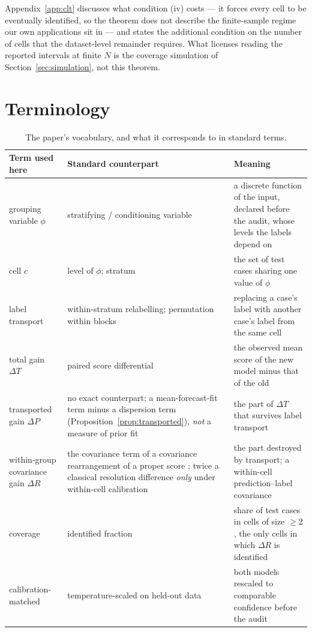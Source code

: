 Appendix~\ref{app:clt} discusses what condition (iv) costs --- it forces every cell to be
eventually identified, so the theorem does not describe the finite-sample regime our own
applications sit in --- and states the additional condition on the number of cells that the
dataset-level remainder requires. What licenses reading the reported intervals at finite $N$
is the coverage simulation of Section~\ref{sec:simulation}, not this theorem.

\section{Terminology}\label{app:terms}

\begin{table}[t]
\centering
\small
\caption{The paper's vocabulary, and what it corresponds to in standard terms.}
\label{tab:terms}
\begin{tabular}{@{}p{}p{}p{}@{}}
\toprule
Term used here & Standard counterpart & Meaning \\
\midrule
grouping variable $\phi$ &
stratifying / conditioning variable &
a discrete function of the input, declared before the audit, whose levels the labels
depend on \\
cell $c$ &
level of $\phi$; stratum &
the set of test cases sharing one value of $\phi$ \\
label transport &
within-stratum relabelling; permutation within blocks &
replacing a case's label with another case's label from the same cell \\
total gain $\Delta T$ &
paired score differential &
the observed mean score of the new model minus that of the old \\
transported gain $\Delta P$ &
no exact counterpart; a mean-forecast-fit term minus a dispersion term
(Proposition~\ref{prop:transported}), \emph{not} a measure of prior fit &
the part of $\Delta T$ that survives label transport \\
within-group covariance gain $\Delta R$ &
the covariance term of a covariance rearrangement of a proper score
\citep{yates1982external}; twice a classical resolution difference \emph{only} under
within-cell calibration &
the part destroyed by transport; a within-cell prediction--label covariance \\
coverage &
identified fraction &
share of test cases in cells of size $\ge2$, the only cells in which $\Delta R$ is
identified \\
calibration-matched &
temperature-scaled on held-out data &
both models rescaled to comparable confidence before the audit \\
\bottomrule
\end{tabular}
\end{table}

